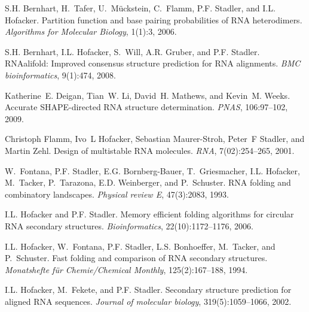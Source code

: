 
\begin{DoxyDescription}
\item[\label{_CITEREF_bernhart:2006}%
\mbox{[}1\mbox{]}]S.\-H. Bernhart, H.~Tafer, U.~M\"{u}ckstein, C.~Flamm, P.\-F. Stadler, and I.\-L. Hofacker. Partition function and base pairing probabilities of R\-N\-A heterodimers. {\itshape Algorithms for Molecular Biology}, 1(1)\-:3, 2006.


\item[\label{_CITEREF_bernhart:2008}%
\mbox{[}2\mbox{]}]S.\-H. Bernhart, I.\-L. Hofacker, S.~Will, A.\-R. Gruber, and P.\-F. Stadler. R\-N\-Aalifold\-: Improved consensus structure prediction for R\-N\-A alignments. {\itshape B\-M\-C bioinformatics}, 9(1)\-:474, 2008.


\item[\label{_CITEREF_deigan:2009}%
\mbox{[}3\mbox{]}]Katherine~E. Deigan, Tian~W. Li, David~H. Mathews, and Kevin~M. Weeks. Accurate S\-H\-A\-P\-E-\/directed R\-N\-A structure determination. {\itshape P\-N\-A\-S}, 106\-:97--102, 2009.


\item[\label{_CITEREF_flamm:2001}%
\mbox{[}4\mbox{]}]Christoph Flamm, Ivo~L Hofacker, Sebastian Maurer-\/\-Stroh, Peter~F Stadler, and Martin Zehl. Design of multistable R\-N\-A molecules. {\itshape R\-N\-A}, 7(02)\-:254--265, 2001.


\item[\label{_CITEREF_fontana:1993b}%
\mbox{[}5\mbox{]}]W.~Fontana, P.\-F. Stadler, E.\-G. Bornberg-\/\-Bauer, T.~Griesmacher, I.\-L. Hofacker, M.~Tacker, P.~Tarazona, E.\-D. Weinberger, and P.~Schuster. R\-N\-A folding and combinatory landscapes. {\itshape Physical review E}, 47(3)\-:2083, 1993.


\item[\label{_CITEREF_hofacker:2006}%
\mbox{[}6\mbox{]}]I.\-L. Hofacker and P.\-F. Stadler. Memory efficient folding algorithms for circular R\-N\-A secondary structures. {\itshape Bioinformatics}, 22(10)\-:1172--1176, 2006.


\item[\label{_CITEREF_hofacker:1994}%
\mbox{[}7\mbox{]}]I.\-L. Hofacker, W.~Fontana, P.\-F. Stadler, L.\-S. Bonhoeffer, M.~Tacker, and P.~Schuster. Fast folding and comparison of R\-N\-A secondary structures. {\itshape Monatshefte f\"{u}r Chemie/\-Chemical Monthly}, 125(2)\-:167--188, 1994.


\item[\label{_CITEREF_hofacker:2002}%
\mbox{[}8\mbox{]}]I.\-L. Hofacker, M.~Fekete, and P.\-F. Stadler. Secondary structure prediction for aligned R\-N\-A sequences. {\itshape Journal of molecular biology}, 319(5)\-:1059--1066, 2002.



\end{DoxyDescription}
